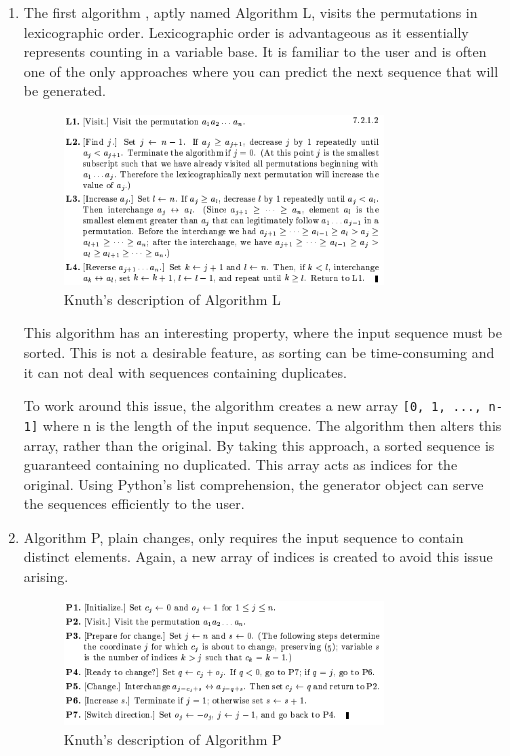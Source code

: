 \documentclass[12pt]{article}
\begin{document}
\begin{enumerate}

\item The first algorithm \cite{perm_L}, aptly named Algorithm L, visits the permutations in lexicographic order. Lexicographic order is advantageous as it essentially represents counting in a variable base. It is familiar to the user and is often one of the only approaches where you can predict the next sequence that will be generated.

\begin{figure}[h]
\centering
\includegraphics[width=0.8\textwidth]{images/perm_L.PNG}
\caption{Knuth's description of Algorithm L \cite{perm_L}}
\end{figure}

This algorithm has an interesting property, where the input sequence must be sorted. This is not a desirable feature, as sorting can be time-consuming and it can not deal with sequences containing duplicates.

To work around this issue, the algorithm creates a new array \lstinline{[0, 1, ..., n-1]} where n is the length of the input sequence. The algorithm then alters this array, rather than the original. By taking this approach, a sorted sequence is guaranteed containing no duplicated. This array acts as indices for the original. Using Python's list comprehension, the generator object can serve the sequences efficiently to the user.

\item Algorithm P, plain changes, only requires the input sequence to contain distinct elements. Again, a new array of indices is created to avoid this issue arising.

\begin{figure}[h]
\centering
\includegraphics[width=0.8\textwidth]{images/perm_P.PNG}
\caption{Knuth's description of Algorithm P \cite{perm_P}}
\end{figure}


\end{enumerate}
\end{document}
